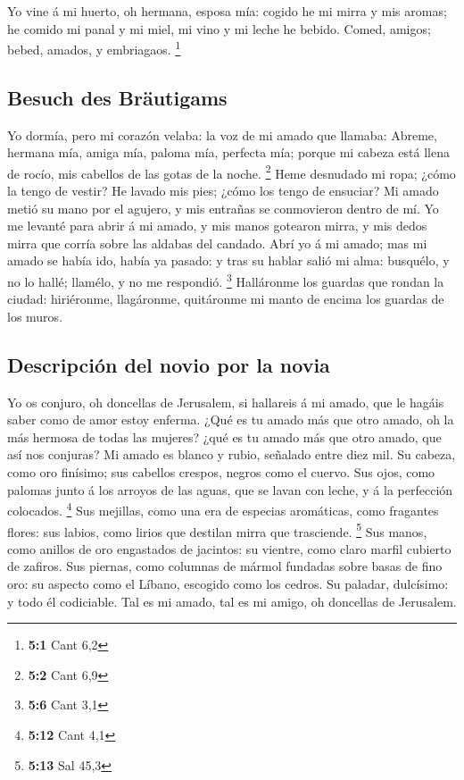  Yo vine á mi huerto, oh hermana, esposa mía: cogido he mi
mirra y mis aromas; he comido mi panal y mi miel, mi vino y mi leche he
bebido. Comed, amigos; bebed, amados, y embriagaos. \footnote{\textbf{5:1}
  Cant 6,2}

\hypertarget{besuch-des-bruxe4utigams}{%
\subsection{Besuch des Bräutigams}\label{besuch-des-bruxe4utigams}}

 Yo dormía, pero mi corazón velaba: la voz de mi amado que
llamaba: Abreme, hermana mía, amiga mía, paloma mía, perfecta mía;
porque mi cabeza está llena de rocío, mis cabellos de las gotas de la
noche. \footnote{\textbf{5:2} Cant 6,9}  Heme desnudado mi
ropa; ¿cómo la tengo de vestir? He lavado mis pies; ¿cómo los tengo de
ensuciar?  Mi amado metió su mano por el agujero, y mis
entrañas se conmovieron dentro de mí.  Yo me levanté para
abrir á mi amado, y mis manos gotearon mirra, y mis dedos mirra que
corría sobre las aldabas del candado.  Abrí yo á mi amado;
mas mi amado se había ido, había ya pasado: y tras su hablar salió mi
alma: busquélo, y no lo hallé; llamélo, y no me respondió. \footnote{\textbf{5:6}
  Cant 3,1}  Halláronme los guardas que rondan la ciudad:
hiriéronme, llagáronme, quitáronme mi manto de encima los guardas de los
muros.

\hypertarget{descripciuxf3n-del-novio-por-la-novia}{%
\subsection{Descripción del novio por la
novia}\label{descripciuxf3n-del-novio-por-la-novia}}

 Yo os conjuro, oh doncellas de Jerusalem, si hallareis á
mi amado, que le hagáis saber como de amor estoy enferma. 
¿Qué es tu amado más que otro amado, oh la más hermosa de todas las
mujeres? ¿qué es tu amado más que otro amado, que así nos conjuras?
 Mi amado es blanco y rubio, señalado entre diez mil.
 Su cabeza, como oro finísimo; sus cabellos crespos,
negros como el cuervo.  Sus ojos, como palomas junto á
los arroyos de las aguas, que se lavan con leche, y á la perfección
colocados. \footnote{\textbf{5:12} Cant 4,1}  Sus
mejillas, como una era de especias aromáticas, como fragantes flores:
sus labios, como lirios que destilan mirra que trasciende. \footnote{\textbf{5:13}
  Sal 45,3}  Sus manos, como anillos de oro engastados de
jacintos: su vientre, como claro marfil cubierto de zafiros.
 Sus piernas, como columnas de mármol fundadas sobre
basas de fino oro: su aspecto como el Líbano, escogido como los cedros.
 Su paladar, dulcísimo: y todo él codiciable. Tal es mi
amado, tal es mi amigo, oh doncellas de Jerusalem.

